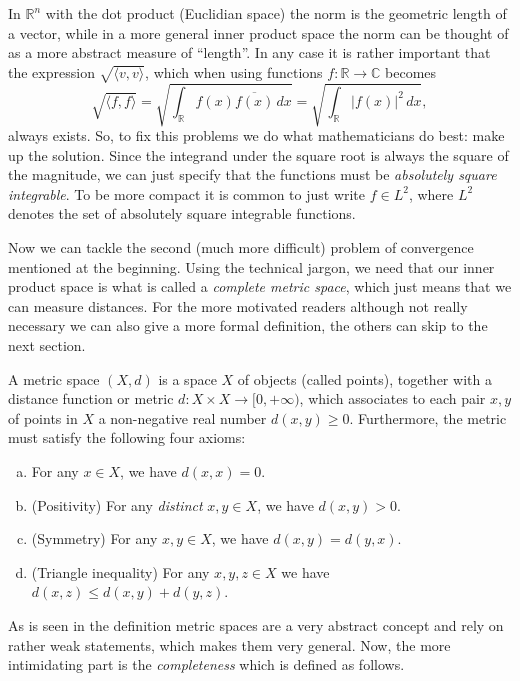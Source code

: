 In \(\mathbb{R}^n\) with the dot product (Euclidian space) the norm is the
geometric length of a vector, while in a more general inner product space the
norm can be thought of as a more abstract measure of ``length''. In any case
it is rather important that the expression \(\sqrt{\langle v, v \rangle}\),
which when using functions \(f: \mathbb{R} \to \mathbb{C}\) becomes
\[
  \sqrt{\langle f, f \rangle} =
  \sqrt{\int_\mathbb{R} f(x) \overline{f(x)} \, dx} =
  \sqrt{\int_\mathbb{R} |f(x)|^2 \, dx},
\]
always exists. So, to fix this problems we do what mathematicians do best:
make up the solution. Since the integrand under the square root is always the
square of the magnitude, we can just specify that the functions must be
\emph{absolutely square integrable}. To be more compact it is common to just
write \(f \in L^2\), where \(L^2\) denotes the set of absolutely square
integrable functions.

Now we can tackle the second (much more difficult) problem of convergence
mentioned at the beginning. Using the technical jargon, we need that our inner
product space is what is called a \emph{complete metric space}, which just
means that we can measure distances. For the more motivated readers although
not really necessary we can also give a more formal definition, the others can
skip to the next section.

\begin{definition}
  \nocite{tao_analysis_2016}
  A metric space \((X, d)\) is a space \(X\) of objects (called points),
  together with a distance function or metric \(d: X \times X \to [0,
  +\infty)\), which associates to each pair \(x, y\) of points in \(X\) a
  non-negative real number \(d(x, y) \geq 0\). Furthermore, the metric must
  satisfy the following four axioms:
  \begin{enumerate}[(a)]
    \item For any \(x\in X\), we have \(d(x, x) = 0\).
    \item (Positivity) For any \emph{distinct} \(x, y \in X\), we have
      \(d(x,y) > 0\).
    \item (Symmetry) For any \(x,y \in X\), we have \(d(x, y) = d(y, x)\).
    \item (Triangle inequality) For any \(x, y, z \in X\) we have
      \(d(x, z) \leq d(x, y) + d(y, z)\).
  \end{enumerate}
\end{definition}

As is seen in the definition metric spaces are a very abstract concept and
rely on rather weak statements, which makes them very general. Now, the more
intimidating part is the \emph{completeness} which is defined as follows.

